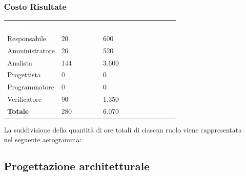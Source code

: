 \subsubsection{Costo Risultate}
{
	\renewcommand{\arraystretch}{2}
	\centering
	\begin{longtable}{ C{3cm} C{2cm} C{4cm}}
		\textcolor{white}{\textbf{Ruolo}} & \textcolor{white}{\textbf{Totale ore}} & \textcolor{white}{\textbf{Costo Ruolo in euro}}\\	
        
        Responsabile & 20 & 600\\
        Amministratore & 26 & 520\\
        Analista & 144 & 3.600 \\
        Progettista & 0 & 0 \\
        Programmatore & 0 & 0 \\
        Verificatore & 90 & 1.350 \\
        \textbf{Totale} & 280 & 6.070 \\
		
	\end{longtable}
}

La suddivisione della quantità di ore totali di ciascun ruolo viene rappresentata nel seguente aerogramma:

\begin{figure}[h]
\end{figure}

\subsection{Progettazione architetturale}

